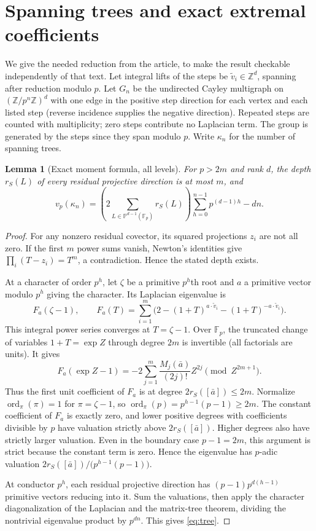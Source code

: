 \documentclass[11pt]{article}
\newtheorem{lemma}[theorem]{Lemma}
\theoremstyle{remark}\newtheorem{remark}[theorem]{Remark}
\newcommand{\F}{\mathbb F}
\newcommand{\Z}{\mathbb Z}
\newcommand{\Pj}{\mathbb P}
\newcommand{\ord}{\operatorname{ord}}
\newcommand{\vp}{v_p}
\begin{document}
\section{Spanning trees and exact extremal coefficients}\label{sec:graph}
We give the needed reduction from the article, to make the result checkable independently of that text. Let integral lifts of the steps be $\widetilde v_i\in\Z^d$, spanning after reduction modulo $p$. Let $G_n$ be the undirected Cayley multigraph on $(\Z/p^n\Z)^d$ with one edge in the positive step direction for each vertex and each listed step (reverse incidence supplies the negative direction). Repeated steps are counted with multiplicity; zero steps contribute no Laplacian term. The group is generated by the steps since they span modulo $p$. Write $\kappa_n$ for the number of spanning trees.

\begin{lemma}[Exact moment formula, all levels]\label{lem:tree}
For $p>2m$ and rank $d$, the depth $r_S(L)$ of every residual projective direction is at most $m$, and
\begin{equation}\label{eq:tree}
 \vp(\kappa_n)=\left(2\sum_{L\in\Pj^{d-1}(\F_p)}r_S(L)\right)
 \sum_{h=0}^{n-1}p^{(d-1)h}-dn.
\end{equation}
\end{lemma}
\begin{proof}
For any nonzero residual covector, its squared projections $z_i$ are not all zero. If the first $m$ power sums vanish, Newton's identities give $\prod_i(T-z_i)=T^m$, a contradiction. Hence the stated depth exists.

At a character of order $p^h$, let $\zeta$ be a primitive $p^h$th root and $a$ a primitive vector modulo $p^h$ giving the character. Its Laplacian eigenvalue is
\[
 F_a(\zeta-1),\qquad F_a(T)=\sum_{i=1}^m\big(2-(1+T)^{a\cdot\widetilde v_i}-(1+T)^{-a\cdot\widetilde v_i}\big).
\]
This integral power series converges at $T=\zeta-1$. Over $\F_p$, the truncated change of variables $1+T=\exp Z$ through degree $2m$ is invertible (all factorials are units). It gives
\[
 F_a(\exp Z-1)=-2\sum_{j=1}^m\frac{M_j(\bar a)}{(2j)!}Z^{2j}\pmod{Z^{2m+1}}.
\]
Thus the first unit coefficient of $F_a$ is at degree $2r_S([\bar a])\le2m$. Normalize $\ord_\pi(\pi)=1$ for $\pi=\zeta-1$, so $\ord_\pi(p)=p^{h-1}(p-1)\ge2m$. The constant coefficient of $F_a$ is exactly zero, and lower positive degrees with coefficients divisible by $p$ have valuation strictly above $2r_S([\bar a])$. Higher degrees also have strictly larger valuation. Even in the boundary case $p-1=2m$, this argument is strict because the constant term is zero. Hence the eigenvalue has $p$-adic valuation $2r_S([\bar a])/\big(p^{h-1}(p-1)\big)$.

At conductor $p^h$, each residual projective direction has $(p-1)p^{d(h-1)}$ primitive vectors reducing into it. Sum the valuations, then apply the character diagonalization of the Laplacian and the matrix-tree theorem, dividing the nontrivial eigenvalue product by $p^{dn}$. This gives \eqref{eq:tree}.
\end{proof}
\end{document}
